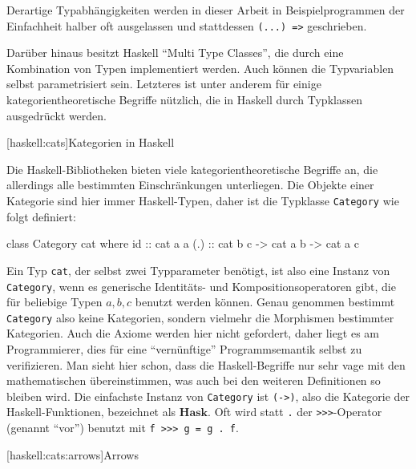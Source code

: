 \documentclass[12pt, a4paper, bibgerm]{scrbook}
\newenvironment{DIFnomarkup}{}{}
\newcommand\icode[1]{\lstinline?#1?}
\newcommand\lsection{}
\newcommand\lsubsection{}
\begin{document}
Derartige Typabhängigkeiten werden in dieser Arbeit in
Beispielprogrammen der Einfachheit halber oft ausgelassen und
stattdessen \icode{(...) =>} geschrieben.

Darüber hinaus besitzt Haskell "`Multi Type Classes"', die durch eine
Kombination von Typen implementiert werden. Auch können die Typvariablen
selbst parametrisiert sein. Letzteres ist unter anderem für einige
kategorientheoretische Begriffe nützlich, die in Haskell durch
Typklassen ausgedrückt werden.

\lsection[haskell:cats]{Kategorien in Haskell}

Die Haskell-Bibliotheken bieten viele kategorientheoretische Begriffe an,
die allerdings alle bestimmten Einschränkungen
unterliegen. Die Objekte einer Kategorie sind hier immer
Haskell-Typen, daher ist die Typklasse \icode{Category} wie folgt definiert:
\begin{DIFnomarkup}\begin{code}
class Category cat where
  id   :: cat a a
  (.)  :: cat b c -> cat a b -> cat a c
\end{code}\end{DIFnomarkup}
Ein Typ \icode{cat}, der selbst zwei Typparameter benötigt, ist also eine
Instanz von \icode{Category}, wenn es generische Identitäts- und
Kompositionsoperatoren gibt, die für beliebige Typen $a,b,c$ benutzt
werden können. Genau genommen bestimmt \icode{Category} also keine
Kategorien, sondern vielmehr die Morphismen bestimmter Kategorien. Auch
die Axiome werden hier nicht gefordert, daher liegt es am
Programmierer, dies für eine "`vernünftige"' Programmsemantik selbst zu
verifizieren. Man sieht hier schon, dass die Haskell-Begriffe nur sehr
vage mit den mathematischen übereinstimmen, was auch bei den
weiteren Definitionen so bleiben wird. Die einfachste Instanz von
\icode{Category} ist \icode{(->)}, also die Kategorie der
Haskell-Funktionen, bezeichnet als $\mathbf{Hask}$.
Oft wird statt \icode{.} der \icode{>>>}-Operator (genannt "`vor"') %
benutzt mit \icode{f >>> g = g . f}. %

\lsubsection[haskell:cats:arrows]{Arrows}
\end{document}
